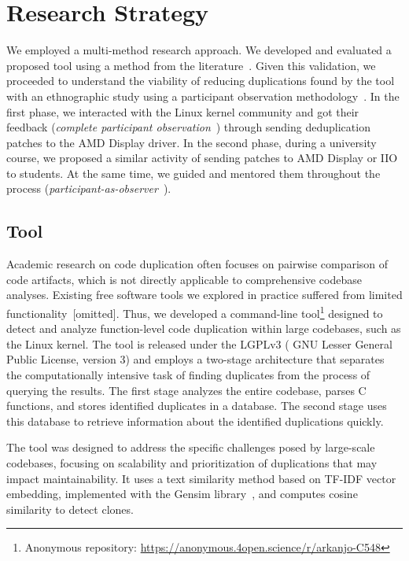 \documentclass[10pt,conference]{IEEEtran}
\begin{document}
\section{Research Strategy}

We employed a multi-method research approach. We developed and evaluated a proposed tool using a method from the literature~\cite{bigclonebench}. Given this validation, we proceeded to understand the viability of reducing duplications found by the tool with an ethnographic study using a participant observation methodology~\cite{gold1958roles}. In the first phase, we interacted with the Linux kernel community and got their feedback (\textit{complete participant observation}~\cite{gold1958roles}) through sending deduplication patches to the AMD Display driver. In the second phase, during a university course, we proposed a similar activity of sending patches to AMD Display or IIO to students. At the same time, we guided and mentored them throughout the process (\textit{participant-as-observer}~\cite{gold1958roles}).

\subsection{Tool}

Academic research on code duplication often focuses on pairwise comparison of code artifacts, which is not directly applicable to comprehensive codebase analyses. Existing free software tools we explored in practice suffered from limited functionality~[omitted]. Thus, we developed a command-line tool\footnote{Anonymous repository:  \url{https://anonymous.4open.science/r/arkanjo-C548}} designed to detect and analyze function-level code duplication within large codebases, such as the Linux kernel. The tool is released under the LGPLv3 ( GNU Lesser General Public License, version 3) and employs a two-stage architecture that separates the computationally intensive task of finding duplicates from the process of querying the results. The first stage analyzes the entire codebase, parses C functions, and stores identified duplicates in a database. The second stage uses this database to retrieve information about the identified duplications quickly.

The tool was designed to address the specific challenges posed by large-scale codebases, focusing on scalability and prioritization of duplications that may impact maintainability. It uses a text similarity method based on TF-IDF vector embedding, implemented with the Gensim library~\cite{gensim}, and computes cosine similarity to detect clones.
\end{document}
